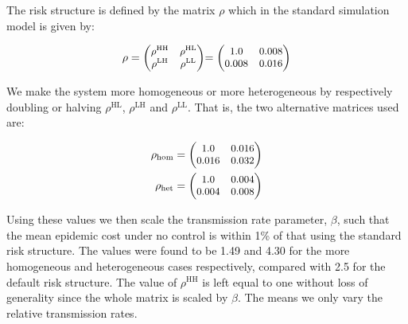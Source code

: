 The risk structure is defined by the matrix $\rho$ which in the standard simulation model is given by:
\begin{linenomath*}
    \begin{equation}
        \begin{alignedat}{3}
            \rho &= \small{\begin{pmatrix}
                \rho^{\mathrm{HH}}& \rho^{\mathrm{HL}}\\
                \rho^{\mathrm{LH}}& \rho^{\mathrm{LL}}
                \end{pmatrix}} &= \small{\begin{pmatrix}
                \num{1.0}& \num{0.008}\\
                \num{0.008}& \num{0.016}
            \end{pmatrix}}
        \end{alignedat}
    \end{equation}
\end{linenomath*}
We make the system more homogeneous or more heterogeneous by respectively doubling or halving $\rho^{\mathrm{HL}}$, $\rho^{\mathrm{LH}}$ and $\rho^{\mathrm{LL}}$. That is, the two alternative matrices used are:
\begin{linenomath*}
\begin{equation}
    \begin{alignedat}{2}
        \rho_{\mathrm{hom}} &= \small{\begin{pmatrix}
            \num{1.0}& \num{0.016}\\
            \num{0.016}& \num{0.032}
        \end{pmatrix}} \\
        \rho_{\mathrm{het}} &= \small{\begin{pmatrix}
            \num{1.0}& \num{0.004}\\
            \num{0.004}& \num{0.008}
        \end{pmatrix}}
    \end{alignedat}
\end{equation}
\end{linenomath*}
Using these values we then scale the transmission rate parameter, $\beta$, such that the mean epidemic cost under no control is within 1\% of that using the standard risk structure. The values were found to be 1.49 and 4.30 for the more homogeneous and heterogeneous cases respectively, compared with 2.5 for the default risk structure. The value of $\rho^{\mathrm{HH}}$ is left equal to one without loss of generality since the whole matrix is scaled by $\beta$. The means we only vary the relative transmission rates.

